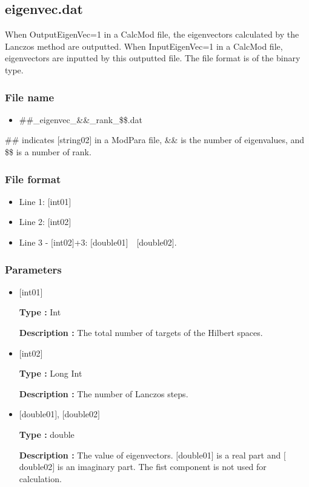 \newpage
\subsection{eigenvec.dat}
\label{Subsec:eigenvec}
When OutputEigenVec=1 in a CalcMod file, the eigenvectors calculated by the Lanczos method are outputted. When InputEigenVec=1 in a CalcMod file, eigenvectors are inputted by this outputted file. The file format is of the binary type. 

\subsubsection{File name}
\begin{itemize}
   \item{\#\#\_eigenvec\_{\&\&}\_rank\_{\$\$}.dat}
\end{itemize}
  \#\# indicates [string02] in a ModPara file, \&\& is the number of eigenvalues, and \$\$ is a number of rank.

\subsubsection{File format}
 \begin{itemize}
   \item  Line 1: $[$int01$]$
   \item  Line 2: $[$int02$]$
   \item  Line 3 -  $[$int02$]$+3: $[$double01$]$~~$[$double02$]$.
  \end{itemize}
  
\subsubsection{Parameters}
 \begin{itemize}

  \item  $[$int01$]$

 {\bf Type :} Int

{\bf Description :}  The total number of targets of the Hilbert spaces.

  \item  $[$int02$]$

 {\bf Type :} Long Int

{\bf Description :}  { The number of Lanczos steps.}

 \item  $[$double01$]$, $[$double02$]$

 {\bf Type :} double 

{\bf Description :} The value of eigenvectors. $[$double01$]$ is a real part and $[$double02$]$ is an imaginary part.
The fist component is not used for calculation.\\

 \end{itemize}

